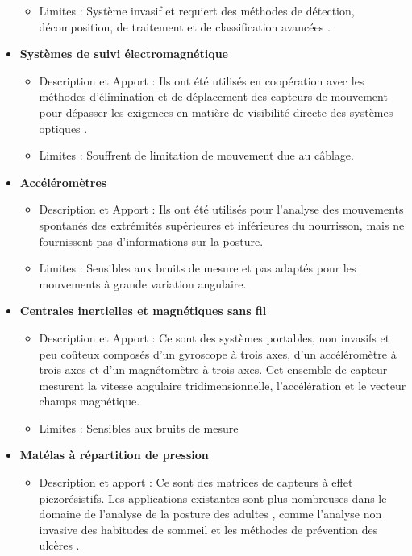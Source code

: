 \documentclass[5pt]{article}
\begin{document}
\begin{itemize}
\begin{itemize}[label={\textbullet}, leftmargin=*]
        \item Limites : Système invasif et requiert des méthodes de détection,
        décomposition, de traitement et de classification avancées \cite{raez_techniques_2006}.
    \end{itemize}
    \item \textbf{Systèmes de suivi électromagnétique}
    \begin{itemize}[label={\textbullet}, leftmargin=*]
        \item Description et Apport : Ils ont été utilisés en coopération avec les méthodes d'élimination et de déplacement des capteurs de mouvement \cite{karch_quantification_2008} pour dépasser les exigences en matière de visibilité directe des systèmes optiques \cite{karch_compensation_2010}.
        \item Limites : Souffrent de limitation de mouvement due au câblage.
    \end{itemize}
    \item \textbf{Accéléromètres}
    \begin{itemize}[label={\textbullet}, leftmargin=*]
        \item Description et Apport :  Ils ont été utilisés pour l'analyse des mouvements spontanés \cite{ohgi_time_2008} des extrémités supérieures \cite{gima_dynamical_2011} et inférieures du nourrisson, mais ne fournissent pas d'informations sur la posture.
        \item Limites : Sensibles aux bruits de mesure et pas adaptés pour les mouvements à grande variation angulaire.
    \end{itemize}
    \item \textbf{Centrales inertielles et magnétiques sans fil}
    \begin{itemize}[label={\textbullet}, leftmargin=*]
        \item Description et Apport : Ce sont des systèmes portables, non invasifs
            et peu coûteux composés d’un gyroscope à trois axes, d’un accéléromètre à trois axes
            et d’un magnétomètre à trois axes. Cet ensemble de capteur mesurent la vitesse angulaire tridimensionnelle, l’accélération et le vecteur champs magnétique.
        \item Limites : Sensibles aux bruits de mesure
    \end{itemize}
    \item \textbf{Matélas à répartition de pression}
    \begin{itemize}[label={\textbullet}, leftmargin=*]
        \item Description et apport : Ce sont des matrices de capteurs à effet piezorésistifs. Les applications existantes sont plus nombreuses dans le domaine de l’analyse de la posture des adultes , comme l’analyse non invasive des habitudes de sommeil \cite{ni_towards_2010,metsis_non-invasive_2014} et les méthodes de prévention des ulcères \cite{yousefi_bed_2011}.

\end{itemize}
\end{itemize}
\end{document}

